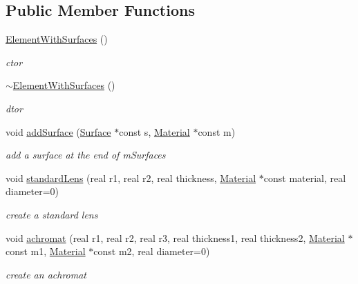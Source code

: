 \subsection*{Public Member Functions}
\begin{DoxyCompactItemize}
\item 
\hyperlink{classElementWithSurfaces_a0d27f004d13a2b81a8ee2b8adba48ea0}{Element\+With\+Surfaces} ()\hypertarget{classElementWithSurfaces_a0d27f004d13a2b81a8ee2b8adba48ea0}{}\label{classElementWithSurfaces_a0d27f004d13a2b81a8ee2b8adba48ea0}

\begin{DoxyCompactList}\small\item\em ctor \end{DoxyCompactList}\item 
\hyperlink{classElementWithSurfaces_a361ebb826758c49bf2de1671bcc861ec}{$\sim$\+Element\+With\+Surfaces} ()\hypertarget{classElementWithSurfaces_a361ebb826758c49bf2de1671bcc861ec}{}\label{classElementWithSurfaces_a361ebb826758c49bf2de1671bcc861ec}

\begin{DoxyCompactList}\small\item\em dtor \end{DoxyCompactList}\item 
void \hyperlink{classElementWithSurfaces_aa884a6c58261c3fb4143785b9bec613e}{add\+Surface} (\hyperlink{classSurface}{Surface} $\ast$const s, \hyperlink{classMaterial}{Material} $\ast$const m)
\begin{DoxyCompactList}\small\item\em add a surface at the end of m\+Surfaces \end{DoxyCompactList}\item 
void \hyperlink{classElementWithSurfaces_a1a80e23ffdde5afe3ae94c105bb0b1ba}{standard\+Lens} (real r1, real r2, real thickness, \hyperlink{classMaterial}{Material} $\ast$const material, real diameter=0)
\begin{DoxyCompactList}\small\item\em create a standard lens \end{DoxyCompactList}\item 
void \hyperlink{classElementWithSurfaces_a32df06ede6cfea6425e68037b69c4dab}{achromat} (real r1, real r2, real r3, real thickness1, real thickness2, \hyperlink{classMaterial}{Material} $\ast$const m1, \hyperlink{classMaterial}{Material} $\ast$const m2, real diameter=0)
\begin{DoxyCompactList}\small\item\em create an achromat \end{DoxyCompactList}\end{DoxyCompactItemize}
